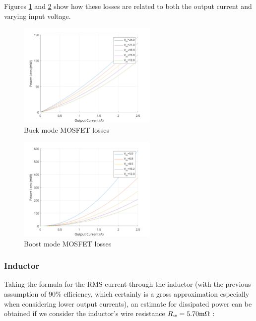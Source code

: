 \documentclass[11pt, a4paper]{article}
\begin{document}
Figures \ref{fig:mosfetBuckLosses} and \ref{fig:mosfetBoostLosses} show how these losses are related to both the output current and varying input voltage.

\begin{figure}[H]
    \centering
    \includegraphics[width=0.6\textwidth]{./figures/mosfetBuckLosses.png}
    \caption{Buck mode MOSFET losses}
    \label{fig:mosfetBuckLosses}
\end{figure}

\begin{figure}[H]
    \centering
    \includegraphics[width=0.6\textwidth]{./figures/mosfetBoostLosses.png}
    \caption{Boost mode MOSFET losses}
    \label{fig:mosfetBoostLosses}
\end{figure}

\subsubsection{Inductor}

Taking the formula for the RMS current through the inductor (with the previous assumption of 90\% efficiency, which certainly is a gross approximation especially when considering lower output currents), an estimate for dissipated power can be obtained if we consider the inductor's wire resistance $R_w = 5.70\text m\Omega$ \cite{XAL1010data}:
\end{document}
